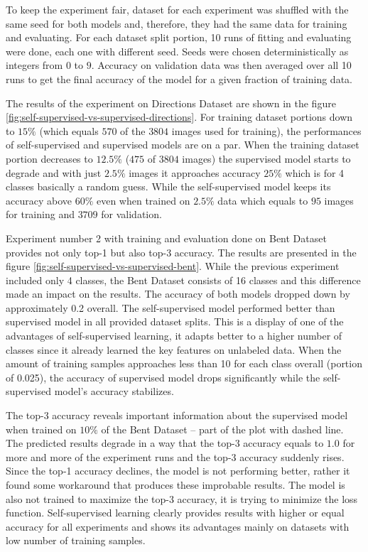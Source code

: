 To keep the experiment fair, dataset for each experiment was shuffled with the same seed for both models and, therefore, they had the same data for training and evaluating. For each dataset split portion, 10 runs of fitting and evaluating were done, each one with different seed. Seeds were chosen deterministically as integers from $0$ to $9$. Accuracy on validation data was then averaged over all 10 runs to get the final accuracy of the model for a given fraction of training data.

The results of the experiment on Directions Dataset are shown in the figure \ref{fig:self-supervised-vs-supervised-directions}. For training dataset portions down to $15 \%$ (which equals $570$ of the $3804$ images used for training), the performances of self-supervised and supervised models are on a par. When the training dataset portion decreases to $12.5 \%$ ($475$ of $3804$ images) the supervised model starts to degrade and with just $2.5 \%$ images it approaches accuracy $25 \%$ which is for 4 classes basically a random guess. While the self-supervised model keeps its accuracy above $60 \%$ even when trained on $2.5 \%$ data which equals to $95$ images for training and $3709$ for validation.

Experiment number 2 with training and evaluation done on Bent Dataset provides not only top-1 but also top-3 accuracy. The results are presented in the figure \ref{fig:self-supervised-vs-supervised-bent}. While the previous experiment included only 4 classes, the Bent Dataset consists of 16 classes and this difference made an impact on the results. The accuracy of both models dropped down by approximately 0.2 overall. The self-supervised model performed better than supervised model in all provided dataset splits. This is a display of one of the advantages of self-supervised learning, it adapts better to a higher number of classes since it already learned the key features on unlabeled data. When the amount of training samples approaches less than 10 for each class overall (portion of 0.025), the accuracy of supervised model drops significantly while the self-supervised model's accuracy stabilizes.

The top-3 accuracy reveals important information about the supervised model when trained on $10 \%$ of the Bent Dataset -- part of the plot with dashed line. The predicted results degrade in a way that the top-3 accuracy equals to $1.0$ for more and more of the experiment runs and the top-3 accuracy suddenly rises. Since the top-1 accuracy declines, the model is not performing better, rather it found some workaround that produces these improbable results. The model is also not trained to maximize the top-3 accuracy, it is trying to minimize the loss function. Self-supervised learning clearly provides results with higher or equal accuracy for all experiments and shows its advantages mainly on datasets with low number of training samples.

